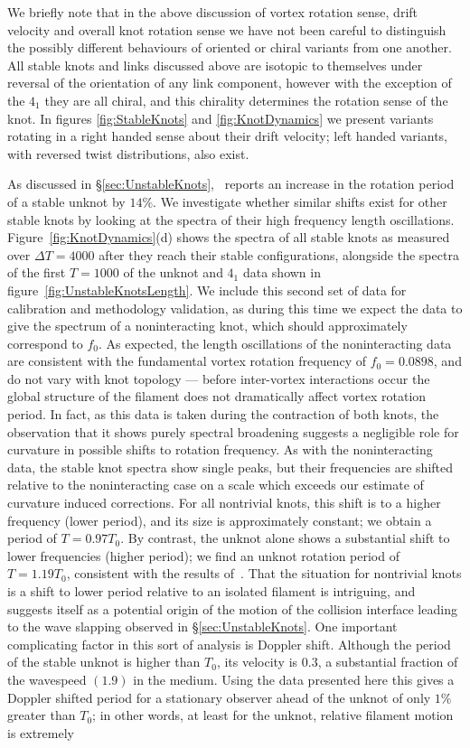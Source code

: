 We briefly note that in the above discussion of vortex rotation sense, drift velocity and overall knot rotation sense we have not been careful to distinguish the possibly different behaviours of oriented or chiral variants from one another. All stable knots and links discussed above are isotopic to themselves under reversal of the orientation of any link component, however with the exception of the $4_1$ they are all chiral, and this chirality determines the rotation sense of the knot. In figures \ref{fig:StableKnots} and \ref{fig:KnotDynamics} we present variants rotating in a right handed sense about their drift velocity; left handed variants, with reversed twist distributions, also exist.

As discussed in \S \ref{sec:UnstableKnots},~\citep{Maucher2018} reports an increase in the rotation period of a stable unknot by $14\%$. We investigate whether similar shifts exist for other stable knots by looking at the spectra of their high frequency length oscillations. Figure~\ref{fig:KnotDynamics}(d) shows the spectra of all stable knots as measured over $\Delta T = 4000$ after they reach their stable configurations, alongside the spectra of the first $T=1000$ of the unknot and $4_1$ data shown in figure~\ref{fig:UnstableKnotsLength}. We include this second set of data for calibration and methodology validation, as during this time we expect the data to give the spectrum of a noninteracting knot, which should approximately correspond to $f_0$. As expected, the length oscillations of the noninteracting data are consistent with the fundamental vortex rotation frequency of $f_0=0.0898$, and do not vary with knot topology --- before inter-vortex interactions occur the global structure of the filament does not dramatically affect vortex rotation period. In fact, as this data is taken during the contraction of both knots, the observation that it shows purely spectral broadening suggests a negligible role for curvature in possible shifts to rotation frequency. As with the noninteracting data, the stable knot spectra show single peaks, but their frequencies are shifted relative to the noninteracting case on a scale which exceeds our estimate of curvature induced corrections. For all nontrivial knots, this shift is to a higher frequency (lower period), and its size is approximately constant; we obtain a period of $T=0.97T_0$. By contrast, the unknot alone shows a substantial shift to lower frequencies (higher period); we find an unknot rotation period of $T=1.19T_0$, consistent with the results of~\citep{Maucher2018}. That the situation for nontrivial knots is a shift to lower period relative to an isolated filament is intriguing, and suggests itself as a potential origin of the motion of the collision interface leading to the wave slapping observed in \S \ref{sec:UnstableKnots}. One important complicating factor in this sort of analysis is Doppler shift. Although the period of the stable unknot is higher than $T_0$, its velocity is $0.3$, a substantial fraction of the wavespeed $(1.9)$ in the medium. Using the data presented here this gives a Doppler shifted period for a stationary observer ahead of the unknot of only $1\%$ greater than $T_0$; in other words, at least for the unknot, relative filament motion is extremely 